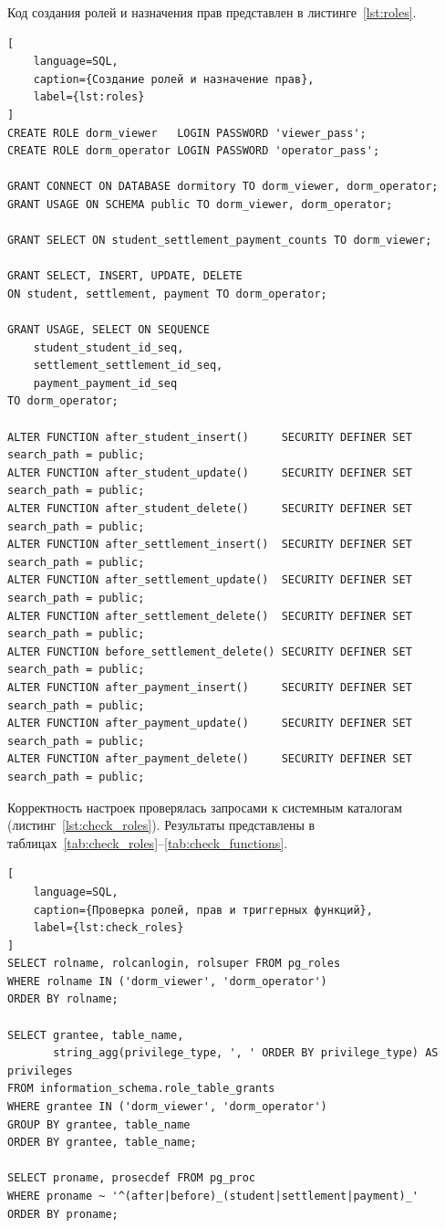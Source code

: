 Код создания ролей и назначения прав представлен в листинге~\ref{lst:roles}.

\begin{lstlisting}[
    language=SQL,
    caption={Создание ролей и назначение прав},
    label={lst:roles}
]
CREATE ROLE dorm_viewer   LOGIN PASSWORD 'viewer_pass';
CREATE ROLE dorm_operator LOGIN PASSWORD 'operator_pass';

GRANT CONNECT ON DATABASE dormitory TO dorm_viewer, dorm_operator;
GRANT USAGE ON SCHEMA public TO dorm_viewer, dorm_operator;

GRANT SELECT ON student_settlement_payment_counts TO dorm_viewer;

GRANT SELECT, INSERT, UPDATE, DELETE
ON student, settlement, payment TO dorm_operator;

GRANT USAGE, SELECT ON SEQUENCE
    student_student_id_seq,
    settlement_settlement_id_seq,
    payment_payment_id_seq
TO dorm_operator;

ALTER FUNCTION after_student_insert()     SECURITY DEFINER SET search_path = public;
ALTER FUNCTION after_student_update()     SECURITY DEFINER SET search_path = public;
ALTER FUNCTION after_student_delete()     SECURITY DEFINER SET search_path = public;
ALTER FUNCTION after_settlement_insert()  SECURITY DEFINER SET search_path = public;
ALTER FUNCTION after_settlement_update()  SECURITY DEFINER SET search_path = public;
ALTER FUNCTION after_settlement_delete()  SECURITY DEFINER SET search_path = public;
ALTER FUNCTION before_settlement_delete() SECURITY DEFINER SET search_path = public;
ALTER FUNCTION after_payment_insert()     SECURITY DEFINER SET search_path = public;
ALTER FUNCTION after_payment_update()     SECURITY DEFINER SET search_path = public;
ALTER FUNCTION after_payment_delete()     SECURITY DEFINER SET search_path = public;
\end{lstlisting}

Корректность настроек проверялась запросами к системным каталогам (листинг~\ref{lst:check_roles}). Результаты представлены в таблицах~\ref{tab:check_roles}--\ref{tab:check_functions}.

\begin{lstlisting}[
    language=SQL,
    caption={Проверка ролей, прав и триггерных функций},
    label={lst:check_roles}
]
SELECT rolname, rolcanlogin, rolsuper FROM pg_roles
WHERE rolname IN ('dorm_viewer', 'dorm_operator')
ORDER BY rolname;

SELECT grantee, table_name,
       string_agg(privilege_type, ', ' ORDER BY privilege_type) AS privileges
FROM information_schema.role_table_grants
WHERE grantee IN ('dorm_viewer', 'dorm_operator')
GROUP BY grantee, table_name
ORDER BY grantee, table_name;

SELECT proname, prosecdef FROM pg_proc
WHERE proname ~ '^(after|before)_(student|settlement|payment)_'
ORDER BY proname;
\end{lstlisting}

